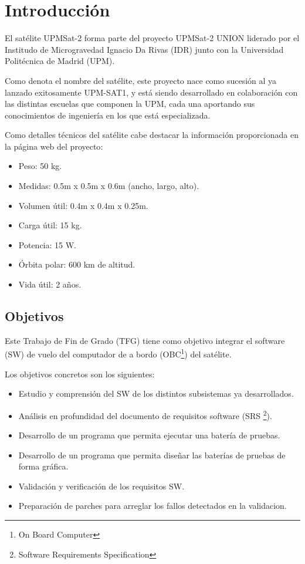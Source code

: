 
\chapter{Introducción}
\label{chap:introduccion}

El satélite UPMSat-2 forma parte del proyecto UPMSat-2 UNION liderado por el
Institudo de Microgravedad Ignacio Da Rivas (IDR) junto con la Universidad
Politécnica de Madrid (UPM).

Como denota el nombre del satélite, este proyecto nace como sucesión al
ya lanzado exitosamente UPM-SAT1, y está siendo desarrollado en colaboración
con las distintas escuelas que componen la UPM, cada una aportando sus
conocimientos de ingeniería en los que está especializada.

Como detalles técnicos del satélite cabe destacar la información proporcionada
en la página web del proyecto\cite{web-upmsat2}:
\begin{itemize}
\item Peso: 50 kg.
\item Medidas: 0.5m x 0.5m x 0.6m (ancho, largo, alto).
\item Volumen útil: 0.4m x 0.4m x 0.25m.
\item Carga útil: 15 kg.
\item Potencia: 15 W.
\item Órbita polar: 600 km de altitud.
\item Vida útil: 2 años.
\end{itemize}

\section{Objetivos}
\label{sec:objetivos}

Este Trabajo de Fin de Grado (TFG) tiene como objetivo integrar el software (SW)
de vuelo del computador de a bordo (OBC\footnote{On Board Computer}) del
satélite.

Los objetivos concretos son los siguientes:
\begin{itemize}
\item Estudio y comprensión del SW de los distintos subsistemas ya
  desarrollados.
\item Análisis en profundidad del documento de requisitos software\cite{} (SRS
  \footnote{Software Requirements Specification}).
\item Desarrollo de un programa que permita ejecutar una batería de pruebas.
\item Desarrollo de un programa que permita diseñar las baterías de pruebas de
  forma gráfica.
\item Validación y verificación de los requisitos SW.
\item Preparación de parches para arreglar los fallos detectados en la
  validacion.
\end{itemize}



